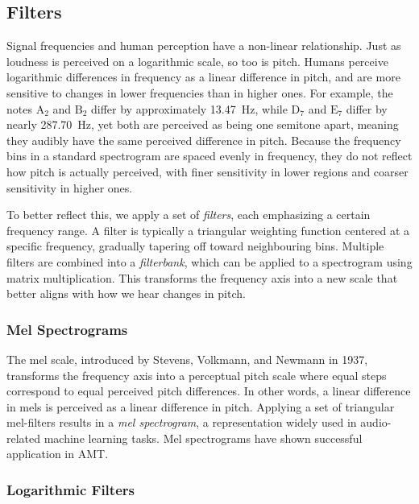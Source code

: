 \subsection{Filters}

Signal frequencies and human perception have a non-linear relationship. Just as loudness is perceived on a logarithmic scale, so too is pitch. Humans perceive logarithmic differences in frequency as a linear difference in pitch, and are more sensitive to changes in lower frequencies than in higher ones. For example, the notes $\text{A}_2$ and $\text{B}_2$ differ by approximately 13.47~Hz, while $\text{D}_7$ and $\text{E}_7$ differ by nearly 287.70~Hz, yet both are perceived as being one semitone apart, meaning they audibly have the same perceived difference in pitch. Because the frequency bins in a standard spectrogram are spaced evenly in frequency, they do not reflect how pitch is actually perceived, with finer sensitivity in lower regions and coarser sensitivity in higher ones.

To better reflect this, we apply a set of \textit{filters}, each emphasizing a certain frequency range. A filter is typically a triangular weighting function centered at a specific frequency, gradually tapering off toward neighbouring bins. Multiple filters are combined into a \textit{filterbank}, which can be applied to a spectrogram using matrix multiplication. This transforms the frequency axis into a new scale that better aligns with how we hear changes in pitch.

\subsubsection{Mel Spectrograms}

The mel scale, introduced by Stevens, Volkmann, and Newmann in 1937, transforms the frequency axis into a perceptual pitch scale where equal steps correspond to equal perceived pitch differences. In other words, a linear difference in mels is perceived as a linear difference in pitch. Applying a set of triangular mel-filters results in a \textit{mel spectrogram}, a representation widely used in audio-related machine learning tasks. Mel spectrograms have shown successful application in \gls{AMT}.~\cite{gardner2022mt3multitaskmultitrackmusic, chang2024yourmt3+, gong2021astaudiospectrogramtransformer, wolfmonheim2024spectralrhythmfeaturesaudio, 8350302}

\subsubsection{Logarithmic Filters}

